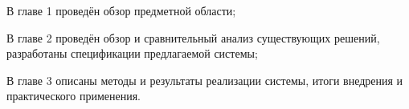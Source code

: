 \documentclass[../document.tex]{subfiles}
\begin{document}
	\par В главе 1 проведён обзор предметной области;
	\par В главе 2 проведён обзор и сравнительный анализ существующих решений, разработаны спецификации предлагаемой системы;
	\par В главе 3 описаны методы и результаты реализации системы, итоги внедрения и практического применения.
\end{document}
